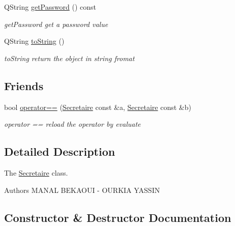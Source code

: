 \begin{DoxyCompactItemize}
Q\+String \mbox{\hyperlink{class_secretaire_ad3555274c8a2ef05af01273ff8513baa}{get\+Password}} () const
\begin{DoxyCompactList}\small\item\em get\+Password get a password value \end{DoxyCompactList}\item 
Q\+String \mbox{\hyperlink{class_secretaire_aa7abbd05fc4b70e69f2c9d748f3e7b2a}{to\+String}} ()
\begin{DoxyCompactList}\small\item\em to\+String return the object in string fromat \end{DoxyCompactList}\end{DoxyCompactItemize}
\subsection*{Friends}
\begin{DoxyCompactItemize}
\item 
bool \mbox{\hyperlink{class_secretaire_a112c35bb24507c5a861a7f84542bcdea}{operator==}} (\mbox{\hyperlink{class_secretaire}{Secretaire}} const \&a, \mbox{\hyperlink{class_secretaire}{Secretaire}} const \&b)
\begin{DoxyCompactList}\small\item\em operator == reload the operator by evaluate \end{DoxyCompactList}\end{DoxyCompactItemize}


\subsection{Detailed Description}
The \mbox{\hyperlink{class_secretaire}{Secretaire}} class. 

\begin{DoxyAuthor}{Authors}
M\+A\+N\+AL B\+E\+K\+A\+O\+UI -\/ O\+U\+R\+K\+IA Y\+A\+S\+S\+IN 
\end{DoxyAuthor}


\subsection{Constructor \& Destructor Documentation}
\mbox{\label{class_secretaire_ae399f6f7212bbe9ba514a3a827aa95d9}} 
